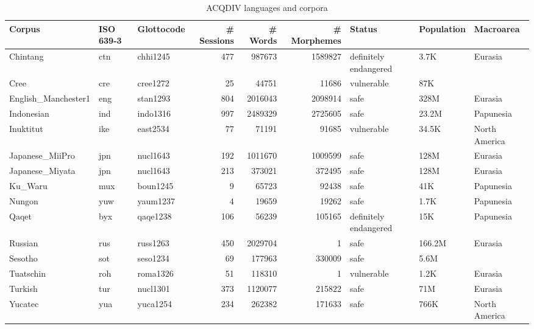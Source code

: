 \begin{table}[ht]
\centering
\begin{tabular}{lllrrrlll}
  \hline
Corpus & ISO 639-3 & Glottocode & \# Sessions & \# Words & \# Morphemes & Status & Population & Macroarea \\ 
  \hline
Chintang & ctn & chhi1245 & 477 & 987673 & 1589827 & definitely endangered & 3.7K & Eurasia \\ 
  Cree & cre & cree1272 &  25 & 44751 & 11686 & vulnerable & 87K &  \\ 
  English\_Manchester1 & eng & stan1293 & 804 & 2016043 & 2098914 & safe & 328M & Eurasia \\ 
  Indonesian & ind & indo1316 & 997 & 2489329 & 2725605 & safe & 23.2M & Papunesia \\ 
  Inuktitut & ike & east2534 &  77 & 71191 & 91685 & vulnerable & 34.5K & North America \\ 
  Japanese\_MiiPro & jpn & nucl1643 & 192 & 1011670 & 1009599 & safe & 128M & Eurasia \\ 
  Japanese\_Miyata & jpn & nucl1643 & 213 & 373021 & 372495 & safe & 128M & Eurasia \\ 
  Ku\_Waru & mux & boun1245 &   9 & 65723 & 92438 & safe & 41K & Papunesia \\ 
  Nungon & yuw & yaum1237 &   4 & 19659 & 19262 & safe & 1.7K & Papunesia \\ 
  Qaqet & byx & qaqe1238 & 106 & 56239 & 105165 & definitely endangered & 15K & Papunesia \\ 
  Russian & rus & russ1263 & 450 & 2029704 &   1 & safe & 166.2M & Eurasia \\ 
  Sesotho & sot & seso1234 &  69 & 177963 & 330009 & safe & 5.6M &  \\ 
  Tuatschin & roh & roma1326 &  51 & 118310 &   1 & vulnerable & 1.2K & Eurasia \\ 
  Turkish & tur & nucl1301 & 373 & 1120077 & 215822 & safe & 71M & Eurasia \\ 
  Yucatec & yua & yuca1254 & 234 & 262382 & 171633 & safe & 766K & North America \\ 
   \hline
\end{tabular}
\caption{ACQDIV languages and corpora} 
\label{tab:ACQDIV languages and corpora}
\end{table}
